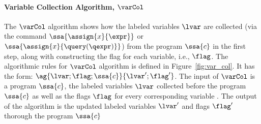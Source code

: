 \paragraph{Variable Collection Algorithm, $\varCol$}
The $\varCol$ algorithm shows how the labeled variables $\lvar$ are collected 
(via the command $\ssa{\assign{x}{\expr}}$ or $\ssa{\assign{x}{\query(\qexpr)}}$) from the program $\ssa{c}$ in the first step, 
along with constructing the flag for each variable, i.e., $\flag$.
The algorithmic rules for $\varCol$ algorithm is defined in Figure~\ref{fig:var_col}. 
It has the form: 
{$\ag{\lvar; \flag; \ssa{c}}{ \lvar'; \flag'} $}. 
The input of $\varCol$ is a program $\ssa{c}$, 
the labeled variables $\lvar$ collected before the program $\ssa{c}$ 
as well as the flags $\flag$ for every corresponding variable .
The output of the algorithm is the updated labeled variables $\lvar'$ and flags $\flag'$ thorough the program $\ssa{c}$
%
%
